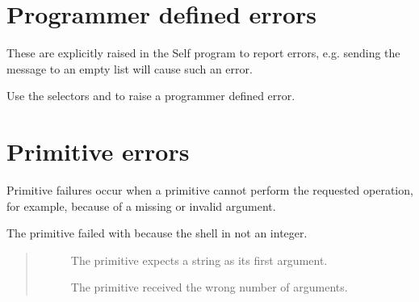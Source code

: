 \documentclass[letterpaper,10pt,english]{sphinxmanual}
\begin{document}
\section{Programmer defined errors}
\label{vmref:programmer-defined-errors}
These are explicitly raised in the Self program to report errors, e.g. sending the message 
to an empty list will cause such an error.
\begin{quote}

\begin{DUlineblock}{0em}
\item[] 
\item[] 
\end{DUlineblock}
\end{quote}

Use the selectors  and  to raise a programmer defined error.


\section{Primitive errors}
\label{vmref:primitive-errors}
Primitive failures occur when a primitive cannot perform the requested operation, for example, because
of a missing or invalid argument.
\begin{quote}

\begin{DUlineblock}{0em}
\item[] 
\item[] 
\end{DUlineblock}
\end{quote}

The primitive failed with  because the shell in not an integer.
\begin{quote}
\begin{description}
\item[{}] \leavevmode
The primitive  expects a string as its first argument.

\item[{}] \leavevmode
The primitive  received the wrong number of arguments.

\end{description}
\end{quote}
\end{document}
